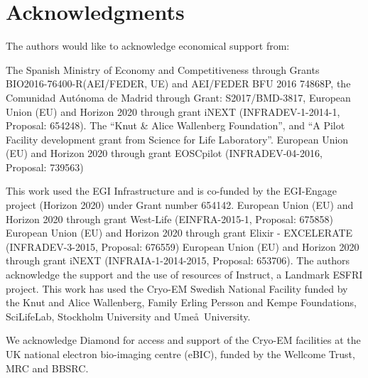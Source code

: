 \section{Acknowledgments}

The authors would like to acknowledge economical support from:

The Spanish Ministry of Economy and Competitiveness through Grants BIO2016-76400-R(AEI/FEDER, UE) and AEI/FEDER BFU 2016 74868P, the Comunidad Aut\'{o}noma de Madrid through Grant: S2017/BMD-3817, European Union (EU) and Horizon 2020 through grant iNEXT (INFRADEV-1-2014-1, Proposal: 654248). The ``Knut \& Alice Wallenberg Foundation'', and ``A Pilot Facility development grant from Science for Life Laboratory''. European Union (EU) and Horizon 2020 through grant EOSCpilot (INFRADEV-04-2016, Proposal: 739563)

This work used the EGI Infrastructure and is co-funded by the EGI-Engage project (Horizon 2020) under Grant number 654142. European Union (EU) and Horizon 2020 through grant West-Life (EINFRA-2015-1, Proposal: 675858) European Union (EU) and Horizon 2020 through grant Elixir - EXCELERATE (INFRADEV-3-2015, Proposal: 676559) European Union (EU) and Horizon 2020 through grant iNEXT (INFRAIA-1-2014-2015, Proposal: 653706). The authors acknowledge the support and the use of resources of Instruct, a Landmark ESFRI project. This work has used the Cryo-EM Swedish National Facility funded by the Knut and Alice Wallenberg, Family Erling Persson and Kempe Foundations, SciLifeLab, Stockholm University and Ume\aa\ University.

We acknowledge Diamond for access and support of the Cryo-EM facilities at the UK national electron bio-imaging centre (eBIC), funded by the Wellcome Trust, MRC and BBSRC.





